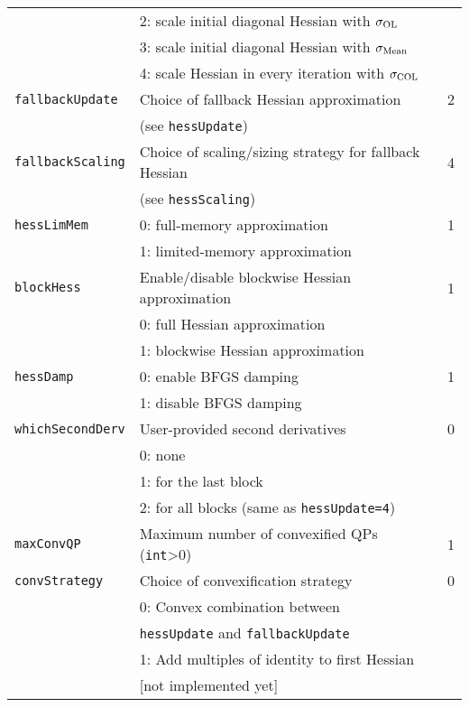 \documentclass[	11pt,
				a4paper,
				abstract=true,
				twoside=true,
				bibliography=totoc, 
				headinclude=true,
				footinclude=false]{scrartcl}
\begin{document}
\begin{longtable}[c]{lll}
								& 2: scale initial diagonal Hessian with $\sigma_{\textup{OL}}$	&			\\
								& 3: scale initial diagonal Hessian with $\sigma_{\textup{Mean}}$	&		\\
								& 4: scale Hessian in every iteration with $\sigma_{\textup{COL}}$	&		\\\hline
%
\texttt{fallbackUpdate}			& Choice of fallback Hessian approximation						& 2			\\
								& (see \texttt{hessUpdate})										&			\\\hline
%
\texttt{fallbackScaling}		& Choice of scaling/sizing strategy for fallback Hessian		& 4			\\
								& (see \texttt{hessScaling})									&			\\\hline
%
\texttt{hessLimMem}				& 0: full-memory approximation									& 1			\\
								& 1: limited-memory approximation								&			\\\hline
%
\texttt{blockHess}				& Enable/disable blockwise Hessian approximation				& 1			\\
								& 0: full Hessian approximation									&			\\
								& 1: blockwise Hessian approximation							&			\\\hline

%
\texttt{hessDamp}				& 0: enable BFGS damping										& 1			\\
								& 1: disable BFGS damping										&			\\\hline
%
\texttt{whichSecondDerv}		& User-provided second derivatives								& 0			\\
								& 0: none														&			\\
								& 1: for the last block											&			\\
								& 2: for all blocks (same as \texttt{hessUpdate=4})				&			\\\hline
\texttt{maxConvQP}				& Maximum number of convexified QPs (\texttt{int}>0)			& 1			\\\hline
%
\texttt{convStrategy}			& Choice of convexification strategy							& 0			\\
								& 0: Convex combination between									&			 \\
								& \phantom{0: }\texttt{hessUpdate} and \texttt{fallbackUpdate}	&			\\
								& 1: Add multiples of identity to first Hessian					&			\\
								& \phantom{1: } [not implemented yet]										&\\\hline
\end{longtable}
\end{document}
